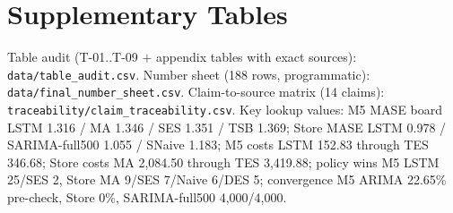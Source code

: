 \section{Supplementary Tables}
\label{app:supp}
Table audit (T-01..T-09 $+$ appendix tables with exact sources):
\texttt{data/table\_audit.csv}. Number sheet (188 rows, programmatic):
\texttt{data/final\_number\_sheet.csv}. Claim-to-source matrix (14 claims):
\texttt{traceability/claim\_traceability.csv}. Key lookup values: M5 MASE
board LSTM 1.316 / MA 1.346 / SES 1.351 / TSB 1.369; Store MASE LSTM 0.978 /
SARIMA-full500 1.055 / SNaive 1.183; M5 costs LSTM 152.83 through TES 346.68;
Store costs MA 2,084.50 through TES 3,419.88; policy wins M5 LSTM 25/SES 2,
Store MA 9/SES 7/Naive 6/DES 5; convergence M5 ARIMA 22.65\% pre-check,
Store 0\%, SARIMA-full500 4,000/4,000.
